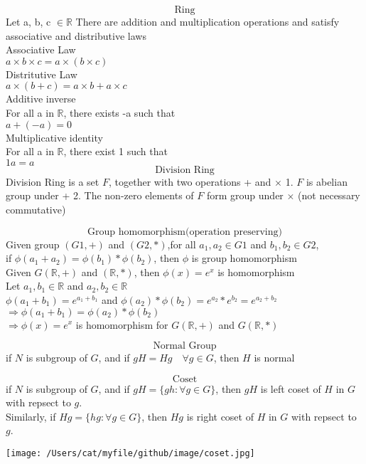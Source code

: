\documentclass{book}
\begin{document}
\[ \text{ Ring } \]
Let a, b, c $\in  \mathbb{R}$ There are addition and multiplication operations and satisfy associative and distributive laws\\

Associative Law\\
$ a \times b \times c = a \times (b \times c) $\\

Distritutive Law\\
$a \times (b + c) = a \times b + a \times c $\\

Additive inverse\\
For all a in $\mathbb{R}$, there exists -a such that\\
$a + (-a) = 0$\\

Multiplicative identity \\
For all a in $\mathbb{R}$, there exist 1 such that\\
$1a = a$ \\

\[ \text{Division Ring} \] 
Division Ring is a set $F$, together with two operations + and $\times$ 
1. $F$ is abelian group under +
2. The non-zero elements of $F$ form group under $\times$ (not necessary commutative)

\[\text{Group homomorphism(operation preserving)}\]
Given group $(G1, +)$ and $(G2, *)$,for all $a_1, a_2 \in G1$ and $b_1, b_2 \in G2$,\\
if $\phi(a_1 + a_2) = \phi(b_1)*\phi(b_2)$, then $\phi$ is group homomorphism\\

Given $G(\mathbb{R}, +)$ and $(\mathbb{R}, *)$, then $\phi(x) = e^x$ is homomorphism\\ 
Let $a_1, b_1 \in \mathbb{R}$ and $a_2, b_2 \in \mathbb{R}$\\ 
$\phi(a_1+b_1) = e^{a_1 + b_1}$ and $\phi(a_2)*\phi(b_2) = e^{a_2}*e^{b_2} = e^{a_2+b_2}$\\
$\Rightarrow \phi(a_1 + b_1) = \phi(a_2)*\phi(b_2)$\\
$\Rightarrow \phi(x) = e^{x}$ is homomorphism for $G(\mathbb{R}, +)$ and $G(\mathbb{R}, *)$

\[\text{Normal Group} \]
if $N$ is subgroup of $G$, and if $gH = Hg \quad \forall g \in G$, then $H$ is normal

\[ \text{Coset} \]
if $N$ is subgroup of $G$, and if $gH = \{gh: \forall g \in G \}$, then $gH$ is left coset of $H$ in $G$ with repsect to $g$.\\
Similarly, if $Hg = \{hg: \forall g \in G \}$, then $Hg$ is right coset of $H$ in $G$ with repsect to $g$.\\
\begin{center}
\texttt{[image: /Users/cat/myfile/github/image/coset.jpg]}\\
\end{center}
\end{document}
